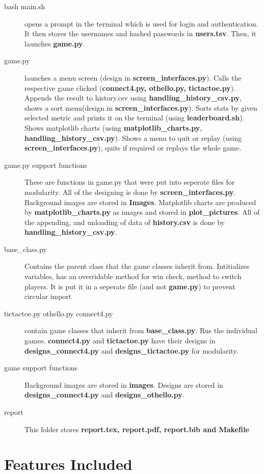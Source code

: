 \documentclass[12pt]{article}
\begin{document}
\begin{description}
  \item[bash main.sh] opens a prompt in the terminal which is used for login and authentication. It then stores the usernames and hashed passwords in \textbf{users.tsv}. Then, it launches \textbf{game.py}.
  \item[game.py] launches a menu screen (design in \textbf{screen\_interfaces.py}).
  Calls the respective game clicked (\textbf{connect4.py, othello.py, tictactoe.py}). 
  Appends the result to history.csv using \textbf{handling\_history\_csv.py}, shows a sort menu(design in \textbf{screen\_interfaces.py}).
  Sorts stats by given selected metric and prints it on the terminal (using \textbf{leaderboard.sh}). 
  Shows matplotlib charts (using \textbf{matplotlib\_charts.py}, \textbf{handling\_history\_csv.py}).
  Shows a menu to quit or replay (using \textbf{screen\_interfaces.py}), quits if required or replays the whole game.
  \item[game.py support functions] These are functions in game.py that were put into seperate files for modularity.
  All of the designing is done by \textbf{screen\_interfaces.py}. Background images are stored in \textbf{Images}.
  Matplotlib charts are produced by \textbf{matplotlib\_charts.py} as images and stored in \textbf{plot\_pictures}.
  All of the appending, and unloading of data of \textbf{history.csv} is done by \textbf{handling\_history\_csv.py}.
  \item[base\_class.py] Contains the parent class that the game classes inherit from. Intitializes variables, has an overridable method for win check, method to switch players. It is put it in a seperate file (and not \textbf{game.py}) to prevent circular import
  \item[tictactoe.py othello.py connect4.py] contain game classes that inherit from \textbf{base\_class.py}. Rus the individual games. 
  \textbf{connect4.py} and \textbf{tictactoe.py} have their designs in \textbf{designs\_connect4.py} and \textbf{designs\_tictactoe.py} for modularity.
  \item[game support functions] Background images are stored in \textbf{images}. 
  Designs are stored in \textbf{designs\_connect4.py} and \textbf{designs\_othello.py}.
  \item[report] This folder stores \textbf{report.tex, report.pdf, report.bib and Makefile}
\end{description}

\section {Features Included}
\end{document}
